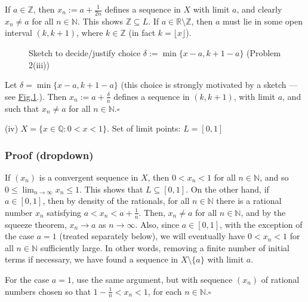 \documentclass[letterpaper,10pt,english]{jupyterBook}
\let\sphinxpxdimen\pdfpxdimen\else\newdimen\sphinxpxdimen
\begin{document}
\sphinxAtStartPar
If \(a\in\mathbb{Z}\), then \(x_n:=a+\frac{1}{2n}\) defines a sequence in \(X\) with limit \(a\), and clearly \(x_n\neq a\) for all \(n\in\mathbb{N}\). This shows \(\mathbb{Z}\subseteq L\). If \(a\in\mathbb{R}\setminus\mathbb{Z}\), then \(a\) must lie in some open interval \((k,k+1)\), where \(k\in\mathbb{Z}\) (in fact \(k=\lfloor x\rfloor\)).

\begin{figure}[htbp]
\centering
\capstart

\noindent\sphinxincludegraphics[width=500\sphinxpxdimen]{{2iii}.png}
\caption{Sketch to decide/justify choice \(\delta:=\min\{x-a,k+1-a\}\) (Problem 2(iii))}\label{\detokenize{Solutions-upto46:iii}}\end{figure}

\sphinxAtStartPar
Let \(\delta=\min\{x-a,k+1-a\}\) (this choice is strongly motivated by a sketch — see \hyperref[\detokenize{Solutions-upto46:iii}]{Fig.\@ \ref{\detokenize{Solutions-upto46:iii}}}.). Then \(x_n:=a+\frac{\delta}{n}\) defines a sequence in \((k,k+1)\), with limit \(a\), and such that \(x_n\neq a\) for all \(n\in\mathbb{N}\).\(\square\)

\sphinxAtStartPar
(iv) \(X=\{x\in\mathbb{Q}:0<x<1\}\). Set of limit points: \(L=[0,1]\)
\subsubsection*{Proof (dropdown)}

\sphinxAtStartPar
If \((x_n)\) is a convergent sequence in \(X\), then \(0<x_n<1\) for all \(n\in\mathbb{N}\), and so \(0\leq\lim_{n\rightarrow\infty}x_n\leq 1\). This shows that \(L\subseteq [0,1]\). On the other hand, if \(a\in[0,1]\), then by density of the rationals, for all \(n\in\mathbb{N}\) there is a rational number \(x_n\) satisfying \(a<x_n<a+\frac{1}{n}\). Then, \(x_n\neq a\) for all \(n\in\mathbb{N}\), and by the squeeze theorem, \(x_n\rightarrow a\) as \(n\rightarrow\infty\). Also, since \(a\in[0,1]\), with the exception of the case \(a=1\) (treated separately below), we will eventually have \(0<x_n<1\) for all \(n\in\mathbb{N}\) sufficiently large. In other words, removing a finite number of initial terms if necessary, we have found a sequence in \(X\setminus\{a\}\) with limit \(a\).

\sphinxAtStartPar
For the case \(a=1\), use the same argument, but with sequence \((x_n)\) of rational numbers chosen so that  \(1-\frac{1}{n}<x_n<1\), for each \(n\in\mathbb{N}\).\(\square\)
\end{document}
